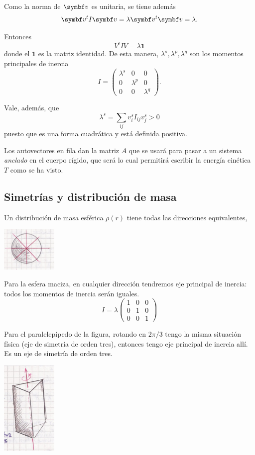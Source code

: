 \documentclass[10pt,oneside]{CBFT_book}
\begin{document}
Como la norma de $\vb{v}$ es unitaria, se tiene además 
\[
	\vb{v}^t I \vb{v} = \lambda \vb{v}^t  \vb{v} = \lambda.
\]

Entonces
\[
	V^t I V = \lambda \mathbf{1}
\]
donde el $\mathbf{1}$ es la matriz identidad. 
De esta manera, $\lambda^s, \lambda^p, \lambda^q$ son los momentos principales de inercia
\[
	I = \begin{pmatrix}
	     \lambda^s & 0 & 0 \\
	     0 & \lambda^p & 0 \\
	     0 & 0  &  \lambda^q
	    \end{pmatrix}.
\]

Vale, además, que
\[
	\lambda^s = \sum_{ij}  v^s_i I_{ij} v^s_j > 0
\]
puesto que es una forma cuadrática y está definida positiva. 

Los autovectores en fila dan la matriz $A$ que se usará para pasar a un sistema {\it anclado} en el cuerpo rígido,
que será lo cual permitirá escribir la energía cinética $T$ como se ha visto.

\subsection{Simetrías y distribución de masa}

Un distribución de masa esférica $\rho(r)$ tiene todas las direcciones equivalentes,

\includegraphics[width=0.2\textwidth]{images/fig_mc_inercia_simetrias_1.jpg}

Para la esfera maciza, en cualquier dirección tendremos eje principal de inercia: todos los momentos de
inercia serán iguales.
\[
	I = \lambda \begin{pmatrix}
	 1 & 0 & 0 \\
	 0 & 1 & 0 \\
	 0 & 0 & 1 
	\end{pmatrix}
\]

Para el paralelepípedo de la figura, rotando en $2\pi/3$ tengo la misma situación física (eje de simetría de orden tres), 
entonces tengo eje principal de inercia allí. Es un eje de simetría de orden tres.

\includegraphics[width=0.2\textwidth]{images/fig_mc_inercia_simetrias_2.jpg}
\end{document}

